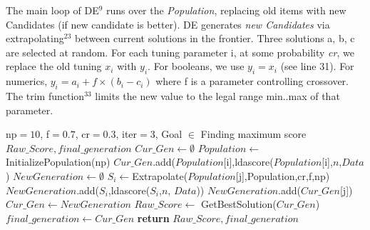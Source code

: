 \documentclass[10pt,conference]{IEEEtran}
\theoremstyle{break}
\begin{document}
The main loop of DE$^{9}$ runs over the \textit{Population}, replacing old items with new Candidates (if new candidate is better).
DE generates \textit{new Candidates} via 
extrapolating$^{23}$ between current solutions in the frontier. Three solutions a, b, c\textit{} are
selected at random. For each tuning parameter i, at some probability \textit{cr}, we
replace the old tuning $x_i$ with $y_i$. For booleans, we use $y_i = x_i$ (see
line 31). For numerics, $y_i = a_i + f \times (b_i - c_i)$ where f is a
parameter controlling crossover. The trim function$^{33}$ limits the new value
to the legal range min..max of that parameter.

\renewcommand{\algorithmicrequire}{\textbf{Input:}}
\renewcommand{\algorithmicensure}{\textbf{Output:}}
\begin{algorithm}
  
    \begin{algorithmic}[1]
    \Require np$=10$, f$=0.7$, cr$=0.3$, iter$=3$, Goal $\in$ Finding maximum score
    \Ensure $Raw\_Score, final\_generation$
        \State  $Cur\_Gen \leftarrow \emptyset$
        \State $Population \leftarrow $InitializePopulation(np)
            \State $Cur\_Gen$.add($Population$[i],ldascore($Population$[i],$n$,$Data$)
        \EndFor
            \State $NewGeneration \leftarrow \emptyset$
                \State $S_i \leftarrow $Extrapolate($Population$[j],Population,cr,f,np)
                    \State $NewGeneration$.add($S_i$,ldascore($S_i$,$n$, $Data$))
                \Else
                    \State $NewGeneration$.add($Cur\_Gen$[j])
                \EndIf
            \State  $Cur\_Gen \leftarrow NewGeneration$
            \EndFor
        \EndFor
        \State $Raw\_Score \leftarrow$ GetBestSolution($Cur\_Gen$)
        \State  $final\_generation \leftarrow Cur\_Gen$
        \State \textbf{return} $Raw\_Score, final\_generation$
    \EndFunction


\end{algorithmic}
\end{algorithm}
\end{document}
